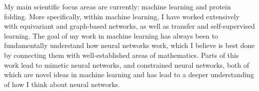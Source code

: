 


My main scientific focus areas are currently: machine learning and protein folding.
More specifically, within machine learning, I have worked extensively with equivariant and graph-based networks, as well as transfer and self-supervised learning.
The goal of my work in machine learning has always been to fundamentally understand how neural networks work, which I believe is best done by connecting them with well-established areas of mathematics.
Parts of this work lead to mimetic neural networks, and constrained neural networks, both of which are novel ideas in machine learning and has lead to a deeper understanding of how I think about neural networks.

